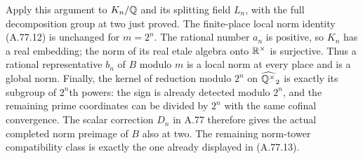 Apply this argument to $K_n/\mathbb Q$ and its splitting
field $L_n$, with the full decomposition group at two
just proved.
The finite-place local norm identity (A.77.12) is
unchanged for $m=2^n$.
The rational number $a_n$ is positive, so $K_n$ has
a real embedding; the norm of its real etale algebra
onto $\mathbb R^\times$ is surjective.
Thus a rational representative $b_n$ of $B$ modulo
$m$ is a local norm at every place and is a global
norm.
Finally, the kernel of reduction modulo $2^n$ on
$\widehat{\mathbb Q^\times}_2$ is exactly its subgroup of
$2^n$th powers: the sign is already detected modulo
$2^n$, and the remaining prime coordinates can be
divided by $2^n$ with the same cofinal convergence.
The scalar correction $D_n$ in A.77 therefore gives
the actual completed norm preimage of $B$ also at two.
The remaining norm-tower compatibility class is
exactly the one already displayed in (A.77.13).
